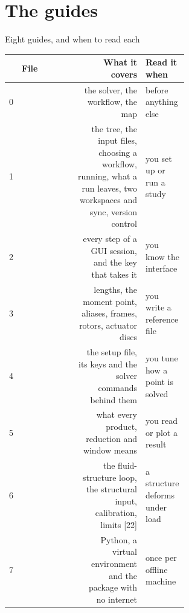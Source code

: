 %
%

\section{The guides}

\begin{frame}{Eight guides, and when to read each}
\relax
{\ftstablesize\renewcommand{\arraystretch}{1.08}
\begin{tabularx}{\linewidth}{@{}P{0.04\linewidth}P{0.31\linewidth}RP{0.24\linewidth}@{}}
\toprule
& \textbf{File}  & \textbf{What it covers} & \textbf{Read it when} \\
 &  & the solver, the workflow, the map &
  before anything else \\
1 &  & the tree, the input files, choosing a
  workflow, running, what a run leaves, two workspaces and sync, version
  control & you set up or run a study \\
2 &  & every step of a GUI session, and the
  key that takes it & you know the interface \\
3 &  & lengths, the moment point, aliases,
  frames, rotors, actuator discs & you write a reference file \\
4 &  & the setup file, its keys and the
  solver commands behind them & you tune how a point is solved \\
5 &  & what every product, reduction
  and window means & you read or plot a result \\
6 &  & the fluid-structure loop, the structural
  input, calibration, limits [22] & a structure deforms under load \\
7 &  & Python, a virtual
  environment and the package with no internet & once per offline machine \\
\bottomrule
\end{tabularx}}
\end{frame}

